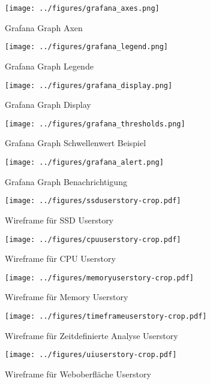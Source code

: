 \begin{figure}[tbp]
  \centering
  \texttt{[image: ../figures/grafana\_axes.png]}
  \caption{Grafana Graph Axen}
\label{figure:grafana_axes}
\end{figure}

\begin{figure}[tbp]
  \centering
  \texttt{[image: ../figures/grafana\_legend.png]}
  \caption{Grafana Graph Legende}
\label{figure:grafana_legend}
\end{figure}

\begin{figure}[tbp]
  \centering
  \texttt{[image: ../figures/grafana\_display.png]}
  \caption{Grafana Graph Display}
\label{figure:grafana_display}
\end{figure}

\begin{figure}[tbp]
  \centering
  \texttt{[image: ../figures/grafana\_thresholds.png]}
  \caption{Grafana Graph Schwellenwert Beispiel}
\label{figure:grafana_thresholds}
\end{figure}

\begin{figure}[tbp]
  \centering
  \texttt{[image: ../figures/grafana\_alert.png]}
  \caption{Grafana Graph Benachrichtigung}
\label{figure:grafana_alert}
\end{figure}

\begin{figure}[tbp]
  \centering
  \texttt{[image: ../figures/ssduserstory-crop.pdf]}
  \caption{Wireframe für SSD Userstory}
\label{figure:ssduserstory}
\end{figure}

\begin{figure}[tbp]
  \centering
  \texttt{[image: ../figures/cpuuserstory-crop.pdf]}
  \caption{Wireframe für CPU Userstory}
\label{figure:cpuuserstory}
\end{figure}

\begin{figure}[tbp]
  \centering
  \texttt{[image: ../figures/memoryuserstory-crop.pdf]}
  \caption{Wireframe für Memory Userstory}
\label{figure:memoryuserstory}
\end{figure}

\begin{figure}[tbp]
  \centering
  \texttt{[image: ../figures/timeframeuserstory-crop.pdf]}
  \caption{Wireframe für Zeitdefinierte Analyse Userstory}
\label{figure:timeframeuserstory}
\end{figure}

\begin{figure}[tbp]
  \centering
  \texttt{[image: ../figures/uiuserstory-crop.pdf]}
  \caption{Wireframe für Weboberfläche Userstory}
\label{figure:uiuserstory}
\end{figure}

